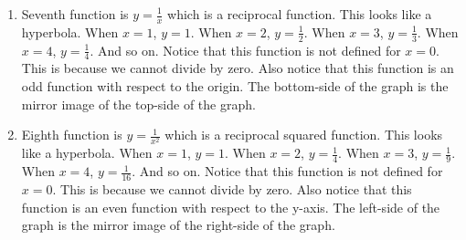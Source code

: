 \begin{enumerate}
	\item Seventh function is $y=\frac{1}{x}$ which is a reciprocal function. This looks like a hyperbola. When $x=1$, $y=1$. When $x=2$, $y=\frac{1}{2}$. When $x=3$, $y=\frac{1}{3}$. When $x=4$, $y=\frac{1}{4}$. And so on. Notice that this function is not defined for $x=0$. This is because we cannot divide by zero. Also notice that this function is an odd function with respect to the origin. The bottom-side of the graph is the mirror image of the top-side of the graph. 
	\item  Eighth function is $y=\frac{1}{x^2}$ which is a reciprocal squared function. This looks like a hyperbola. When $x=1$, $y=1$. When $x=2$, $y=\frac{1}{4}$. When $x=3$, $y=\frac{1}{9}$. When $x=4$, $y=\frac{1}{16}$. And so on. Notice that this function is not defined for $x=0$. This is because we cannot divide by zero. Also notice that this function is an even function with respect to the y-axis. The left-side of the graph is the mirror image of the right-side of the graph. 
\end{enumerate}